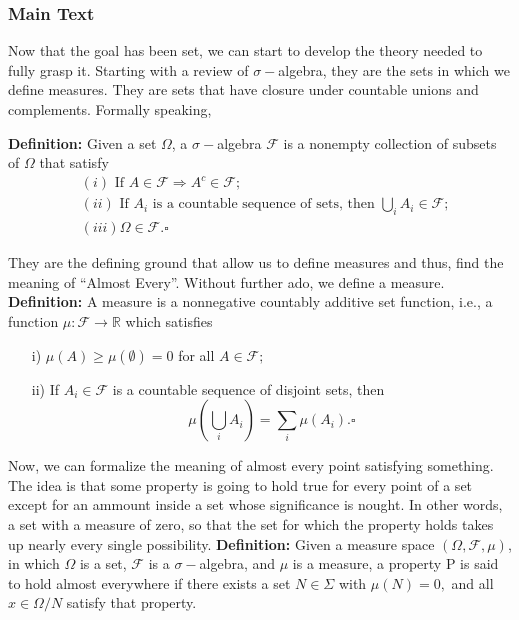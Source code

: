 \documentclass[a4paper]{article}
\theoremstyle{plain}
\theoremstyle{definition}
\begin{document}
   \subsubsection{Main Text} 
   Now that the goal has been set, we can start to develop the theory needed to fully grasp it. Starting with a review of $\sigma-$algebra, 
 they are the sets in which we define measures. They are sets that have closure under countable unions and complements. Formally speaking,  
    
\textbf{Definition:}    Given a set $\Omega$, a $\sigma-$algebra $\mathcal{F}$ is a nonempty collection of subsets of $\Omega$ that satisfy 
   \begin{align*} 
     &(i) \text{ If }A\in \mathcal{F} \Rightarrow A^{c}\in \mathcal{F};\\ 
     &(ii) \text{ If } A_{i} \text{ is a countable sequence of sets, then } \bigcup_{i}A_{i}\in \mathcal{F};\\ 
     &(iii) \Omega\in \mathcal{F}.\square 
   \end{align*} 

  
  They are the defining ground that allow us to define measures and thus, find the meaning of ``Almost Every''. Without further ado, 
 we define a measure. 
\textbf{Definition:}    A measure is a nonnegative countably additive set function, i.e., a function $\mu:\mathcal{F}\rightarrow \mathbb{R}$ which satisfies 
   \begin{itemize} 
     \item[i)] $\mu(A)\geq{\mu(\emptyset)}=0$ for all $A\in \mathcal{F};$  
     \item[ii)] If $A_{i}\in \mathcal{F}$ is a countable sequence of disjoint sets, then 
       $$ 
         \mu(\bigcup_{i}A_{i}) = \sum\limits_{i}^{}\mu(A_{i}).\square 
       $$ 
   \end{itemize} 
  Now, we can formalize the meaning of almost every point satisfying something. The idea is that some property is going to hold true 
 for every point of a set except for an ammount inside a set whose significance is nought. In other words, a set with a measure of zero, so that 
 the set for which the property holds takes up nearly every single possibility.  
\textbf{Definition:}    Given a measure space $(\Omega, \mathcal{F}, \mu)$, in which $\Omega$ is a set, $\mathcal{F}$ is a $\sigma-$algebra, and $\mu$ is a measure,  
  a property P is said to hold almost everywhere if there exists a set $N\in\Sigma$ with $\mu(N) = 0,$ and all $x\in\Omega/N$ satisfy that property. 
\end{document}

